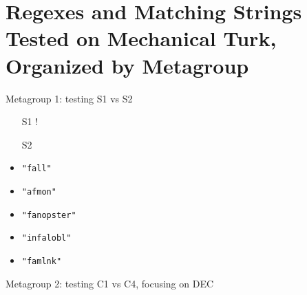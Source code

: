 \section*{Regexes and Matching Strings Tested on Mechanical Turk, Organized by Metagroup}
\label{app:MTstudyInput}
\begin{footnotesize}
Metagroup 1: testing S1 vs S2
\vspace{-5mm}
\begin{multicols}{3}
\begin{itemize}[noitemsep,topsep=0pt]
\item[S1] \cverb!%
\item[S2] 
\item[] \verb|"fall"|
\item[] \verb|"afmon"|
\item[] \verb|"fanopster"|
\item[] \verb|"infalobl"|
\item[] \verb|"famlnk"|
\end{itemize}
\end{multicols}
\vspace{-2mm}
Metagroup 2: testing C1 vs C4, focusing on DEC
\vspace{-5mm}
\begin{multicols}{3}
\begin{itemize}[noitemsep,topsep=0pt]

\end{itemize}
\end{multicols}
\end{footnotesize}
